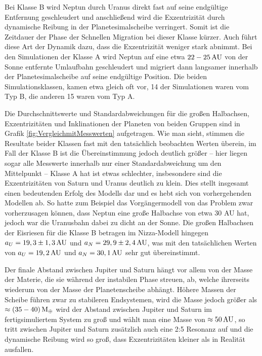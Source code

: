 \documentclass[12pt,a4paper,twoside]{article}
\renewcommand{\cite}{\citep}
\newcommand{\ME}{M_\oplus}
\begin{document}
Bei Klasse B wird Neptun durch Uranus direkt fast auf seine endgültige Entfernung geschleudert %
und anschließend wird die Exzentrizität durch dynamische Reibung in der Planetesimalscheibe verringert\cite{Nesvorny2007}. Somit ist die Zeitdauer der Phase der Schnellen Migration bei dieser Klasse kürzer\cite{Tsiganis2005}. Auch führt diese Art der Dynamik dazu, dass die Exzentrizität weniger stark abnimmt\cite{Tsiganis2005}.
Bei den Simulationen der Klasse A wird Neptun auf eine etwa $\unit[22-25]{AU}$ von der Sonne entfernte Umlaufbahn geschleudert und migriert dann langsamer innerhalb der Planetesimalscheibe auf seine endgültige Position\cite{Tsiganis2005}.
Die beiden Simulationsklassen, kamen etwa gleich oft vor, 14 der Simulationen waren vom Typ B, die anderen 15 waren vom Typ A.

Die Durchschnittswerte und Standardabweichungen für die großen Halbachsen, Exzentrizitäten und Inklinationen der Planeten von beiden Gruppen sind in Grafik \ref{fig:VergleichmitMesswerten} aufgetragen. Wie man sieht, stimmen die Resultate beider Klassen fast mit den tatsächlich beobachten Werten überein, im Fall der Klasse B ist die Übereinstimmung jedoch deutlich größer – hier liegen sogar alle Messwerte innerhalb nur einer Standardabweichung um den Mittelpunkt\cite{Tsiganis2005} – Klasse A hat ist etwas schlechter, insbesondere sind die Exzentrizitäten von Saturn und Uranus deutlich zu klein\cite{Tsiganis2005,Nesvorny2007}. 
Dies stellt insgesamt einen bedeutenden Erfolg des Modells dar und es hebt sich von vorhergehenden Modellen ab.
So hatte zum Beispiel das Vorgängermodell von \cite{Gomes2004} das Problem zwar vorherzusagen können, dass Neptun eine große Halbachse von etwa 30 AU hat, jedoch war die Uranusbahn dabei zu dicht an der Sonne.
Die großen Halbachsen der Eisriesen für die Klasse B betragen im Nizza-Modell hingegen $a_U = \unit[19,3 \pm 1,3]{AU}$ und $a_N = \unit[29,9 \pm 2,4]{AU}$, was mit den tatsächlichen Werten von $a_U = \unit[19,2]{AU}$ und $a_N = \unit[30,1]{AU}$ sehr gut übereinstimmt\cite{Tsiganis2005}.

Der finale Abstand zwischen Jupiter und Saturn hängt vor allem von der Masse der Materie,
die sie während der instabilen Phase streuen, ab, welche ihrerseits wiederum von der Masse der Planetenscheibe abhängt\cite{Tsiganis2005}. %
Höhere Massen der Scheibe führen zwar zu stabileren Endsystemen, wird die Masse jedoch größer als $\approx \unit[(35-40)]{\ME}$ wird der Abstand zwischen Jupiter und Saturn im fertigsimuliertem System zu groß\cite{Tsiganis2005} und wählt man eine Masse von $\approx \unit[50]{AU}$, so tritt zwischen Jupiter und Saturn zusätzlich auch eine 2:5 Resonanz auf und die dynamische Reibung wird so groß, dass Exzentrizitäten kleiner als in Realität ausfallen\cite{Tsiganis2005}.
\end{document}
